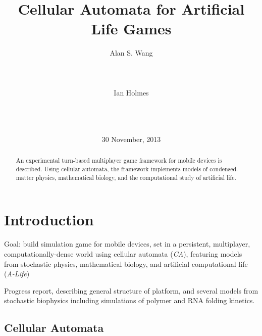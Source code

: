 \documentclass{acm_proc_article-sp}
\begin{document}
\title{Cellular Automata for Artificial Life Games}
\author{
\alignauthor
Alan S. Wang\\
       \\
       \\
       \\
\alignauthor
Ian Holmes\\
       \\
       \\
       \\
}
\date{30 November, 2013}

\maketitle
\begin{abstract}
An experimental turn-based multiplayer game framework for mobile devices is described.
Using cellular automata, the framework implements models
of condensed-matter physics, mathematical biology,
and the computational study of artificial life.
\end{abstract}



\section{Introduction}

Goal: 
build simulation game for mobile devices,
set in a persistent, multiplayer, computationally-dense world
using cellular automata ({\em CA}),
featuring models from
stochastic physics,
mathematical biology,
 and
artificial computational life ({\em A-Life})

Progress report, describing general structure of platform,
and several models from stochastic biophysics
including simulations of polymer and RNA folding kinetics.

\subsection{Cellular Automata}
\end{document}
